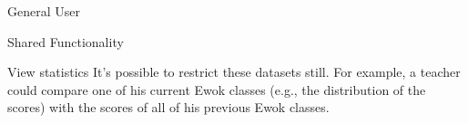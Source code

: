 \begin{section}{General User}
\begin{subsection}{Shared Functionality}
\begin{subsubsection}{View statistics}
            It's possible to restrict these datasets still. For example, a
            teacher could compare one of his current Ewok classes (e.g., the
            distribution of the scores) with the scores of all of his previous
            Ewok classes.
        \end{subsubsection}

    \end{subsection}

\end{section}


